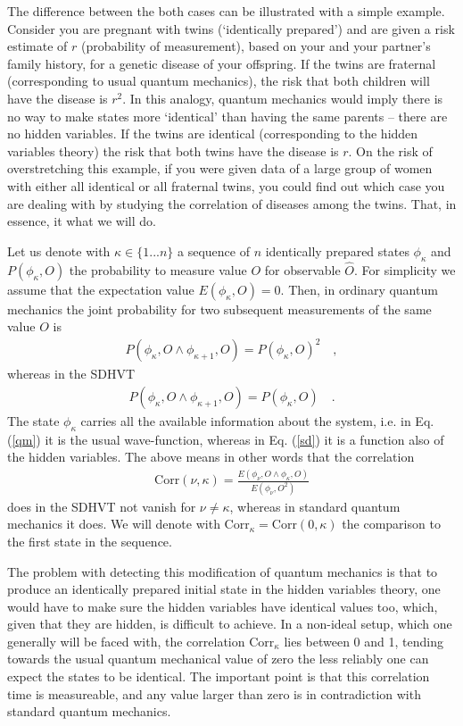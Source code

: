 \documentclass{svjour2}                    %
\newcommand{\beqn}{\begin{eqnarray}}
\newcommand{\eeqn}{\end{eqnarray}}
\begin{document}
The difference between the both cases can be illustrated with a simple example. Consider
you are pregnant with twins (`identically prepared') and are given a risk estimate of $r$ 
(probability of measurement), based on your and your partner's family 
history, for a genetic disease of your offspring. If the twins are fraternal (corresponding to usual quantum mechanics), the risk 
that both children will have the disease is $r^2$. In this analogy,
quantum mechanics would imply there is no way to make states more `identical' than having 
the same parents -- there are no hidden variables. If the twins are identical (corresponding to the hidden
variables theory) the risk that both twins have the disease is $r$. On the risk of overstretching this
example, if you were given data of a large group of women with either all identical or all fraternal twins, you could
find out which case you are dealing with by studying the correlation of diseases among the twins. 
That, in essence, it what we will do.

Let us denote with $\kappa \in \{1...n\}$ a sequence of $n$ identically prepared states $\phi_\kappa$ and $P(\phi_\kappa, O)$
the probability to measure value $O$ for observable $\hat O$. For simplicity we assume that
the expectation value  $E(\phi_\kappa,O) =0$. Then, in ordinary
quantum mechanics the joint probability for two subsequent measurements of the same value $O$ is
\beqn
P(\phi_\kappa, O \wedge \phi_{\kappa +1}, O) =  P(\phi_\kappa, O)^2 \quad, \label{qm}
\eeqn
whereas in the {\sc SDHVT}
\beqn
P(\phi_\kappa, O \wedge \phi_{\kappa +1}, O) = P(\phi_\kappa, O) \quad. \label{sd}
\eeqn
The state $\phi_\kappa$ carries all the available information about the system,
i.e. in Eq. (\ref{qm}) it is the usual wave-function, whereas in Eq. (\ref{sd}) it is a
function also of the hidden variables. The above means in other words that the correlation
\beqn
{\mathrm{Corr}}(\nu,\kappa) = \frac{E(\phi_{\nu}, O \wedge \phi_{\kappa}, O  )}{E(\phi_\nu, O^2)}
\eeqn
does in the {\sc SDHVT} not vanish for $\nu \neq \kappa$, whereas in standard quantum mechanics
it does. We will denote with ${\mathrm{Corr}}_\kappa = {\mathrm{Corr}}(0,\kappa)$ the
comparison to the first state in the sequence.


The problem with detecting this modification of quantum mechanics 
is that to produce an identically prepared initial state in the hidden variables theory, 
one would have to make sure the hidden variables have identical values too, which, 
given that they are hidden, is difficult to achieve. In a non-ideal setup, which
one generally will be faced with, the correlation ${\mathrm{Corr}}_\kappa$ lies between 0 and 1,
tending towards the usual quantum mechanical value of zero the less reliably one can
expect the states to be identical. The important point is that this correlation time is
measureable, and any value larger than zero is in contradiction with standard
quantum mechanics.
\end{document}

